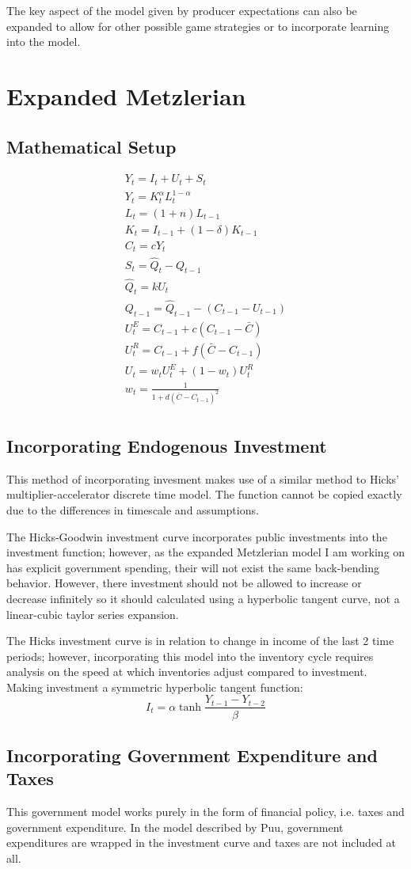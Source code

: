 \documentclass[]{article}
\begin{document}
The key aspect of the model given by producer expectations can also be expanded to allow for other possible game strategies or to incorporate learning into the model. 
\pagebreak
\section{Expanded Metzlerian}
\subsection*{Mathematical Setup}
\begin{gather*}
	Y_t = I_t + U_t + S_t\\
	Y_t = K_t^\alpha L_t^{1-\alpha}\\
	L_t = (1+n) L_{t-1}\\
	K_t = I_{t-1} + (1-\delta) K_{t-1}\\
	C_t = cY_t\\
	S_t=\hat Q_t-Q_{t-1}\\
	\hat Q_t=k U_t\\
	Q_{t-1}=\hat Q_{t-1}-(C_{t-1}-U_{t-1})\\
	U_t^E=C_{t-1}+c(C_{t-1}-\bar C)\\
	U_t^R=C_{t-1}+f(\bar C-C_{t-1})\\
	U_t=w_tU_t^E+(1-w_t)U_t^R\\
	w_t=\frac{1}{1+d(\bar C-C_{t-1})^2}\\
\end{gather*}
\subsection*{Incorporating Endogenous Investment}
This method of incorporating invesment makes use of a similar method to Hicks' multiplier-accelerator discrete time model. The function cannot be copied exactly due to the differences in timescale and assumptions. 

The Hicks-Goodwin investment curve incorporates public investments into the investment function; however, as the expanded Metzlerian model I am working on has explicit government spending, their will not exist the same back-bending behavior. However, there investment should not be allowed to increase or decrease infinitely so it should calculated using a hyperbolic tangent curve, not a linear-cubic taylor series expansion.

The Hicks investment curve is in relation to change in income of the last 2 time periods; however, incorporating this model into the inventory cycle requires analysis on the speed at which inventories adjust compared to investment. 
	Making investment a symmetric hyperbolic tangent function:
	\begin{equation*}
		I_t = \alpha \tanh \frac{Y_{t-1}-Y_{t-2}}{\beta}
	\end{equation*}

\subsection*{Incorporating Government Expenditure and Taxes}
This government model works purely in the form of financial policy, i.e. taxes and government expenditure. In the model described by Puu, government expenditures are wrapped in the investment curve and taxes are not included at all. 
\end{document}
